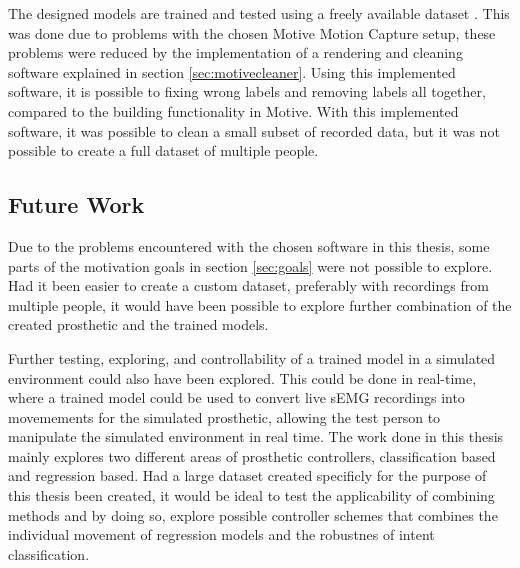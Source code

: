 \documentclass[../main.tex]{subfiles}
\begin{document}
The designed models are trained and tested using a freely available dataset \cite{kinmusdataset}.
This was done due to problems with the chosen Motive Motion Capture setup, these problems were reduced by the implementation of a rendering and cleaning software explained in section \ref{sec:motivecleaner}.
Using this implemented software, it is possible to fixing wrong labels and removing labels all together, compared to the building functionality in Motive.
With this implemented software, it was possible to clean a small subset of recorded data, but it was not possible to create a full dataset of multiple people.



\newpage
\subsection{Future Work}

Due to the problems encountered with the chosen software in this thesis, some parts of the motivation goals in section \ref{sec:goals} were not possible to explore.
Had it been easier to create a custom dataset, preferably with recordings from multiple people, it would have been possible to explore further combination of the created prosthetic and the trained models.

Further testing, exploring, and controllability of a trained model in a simulated environment could also have been explored.
This could be done in real-time, where a trained model could be used to convert live sEMG recordings into movemements for the simulated prosthetic, allowing the test person to manipulate the simulated environment in real time.
The work done in this thesis mainly explores two different areas of prosthetic controllers, classification based and regression based.
Had a large dataset created specificly for the purpose of this thesis been created, it would be ideal to test the applicability of combining methods and by doing so, explore possible controller schemes that combines the individual movement of regression models and the robustnes of intent classification.  

\end{document}
